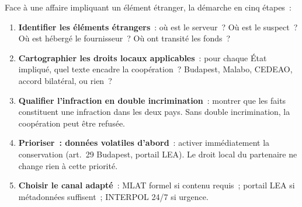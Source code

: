 Face à une affaire impliquant un élément étranger, la démarche en
cinq étapes~:

\begin{enumerate}
    \item \textbf{Identifier les éléments étrangers}~: où est le serveur~?
          Où est le suspect~? Où est hébergé le fournisseur~? Où ont transité
          les fonds~?
    \item \textbf{Cartographier les droits locaux applicables}~: pour chaque
          État impliqué, quel texte encadre la coopération~? Budapest,
          Malabo, CEDEAO, accord bilatéral, ou rien~?
    \item \textbf{Qualifier l'infraction en double incrimination}~: montrer
          que les faits constituent une infraction dans les deux pays. Sans
          double incrimination, la coopération peut être refusée.
    \item \textbf{Prioriser~: données volatiles d'abord}~: activer
          immédiatement la conservation (art.~29 Budapest, portail LEA).
          Le droit local du partenaire ne change rien à cette priorité.
    \item \textbf{Choisir le canal adapté}~: MLAT formel si contenu
          requis~; portail LEA si métadonnées suffisent~; INTERPOL 24/7
          si urgence.
\end{enumerate}

